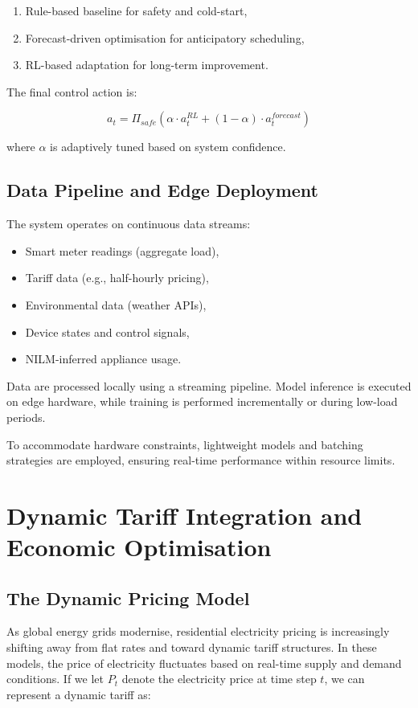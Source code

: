 \documentclass[11pt,a4paper]{article}
\begin{document}
\begin{enumerate}
    \item Rule-based baseline for safety and cold-start,
    \item Forecast-driven optimisation for anticipatory scheduling,
    \item RL-based adaptation for long-term improvement.
\end{enumerate}

The final control action is:

$$
a_t = \Pi_{safe} \left( \alpha \cdot a_t^{RL} + (1-\alpha) \cdot a_t^{forecast} \right)
$$

where $\alpha$ is adaptively tuned based on system confidence.

\subsection{Data Pipeline and Edge Deployment}

The system operates on continuous data streams:

\begin{itemize}
    \item Smart meter readings (aggregate load),
    \item Tariff data (e.g., half-hourly pricing),
    \item Environmental data (weather APIs),
    \item Device states and control signals,
    \item NILM-inferred appliance usage.
\end{itemize}

Data are processed locally using a streaming pipeline. Model inference is executed on edge hardware, while training is performed incrementally or during low-load periods.

To accommodate hardware constraints, lightweight models and batching strategies are employed, ensuring real-time performance within resource limits.


\section{Dynamic Tariff Integration and Economic Optimisation}

\subsection{The Dynamic Pricing Model}

As global energy grids modernise, residential electricity pricing is increasingly shifting away from flat rates and toward dynamic tariff structures. In these models, the price of electricity fluctuates based on real-time supply and demand conditions. If we let $P_t$ denote the electricity price at time step $t$, we can represent a dynamic tariff as:
\end{document}
